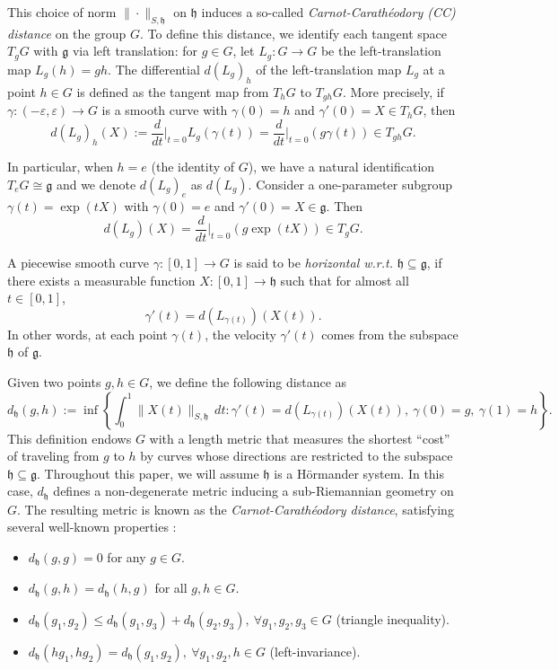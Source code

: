 \documentclass[11pt,reqno]{amsart}
\numberwithin{equation}{section}
\begin{document}
This choice of norm $\|\cdot\|_{S,\mathfrak{h}}$ on $\mathfrak{h}$ induces a so-called \textit{Carnot-Carathéodory (CC) distance} on the group $G$. To define this distance, we identify each tangent space $T_g G$ with $\mathfrak{g}$ via left translation: for $g \in G$, let $L_g: G \to G$ be the left-translation map $L_g(h) = gh$. The differential $d(L_g)_h$ of the left-translation map $L_g$ at a point $h \in G$ is defined as the tangent map from $T_h G$ to $T_{gh} G$. More precisely, if $\gamma: (-\varepsilon,\varepsilon) \to G$ is a smooth curve with $\gamma(0)=h$ and $\gamma'(0)=X \in T_h G$, then
$$
d(L_g)_h(X) := \frac{d}{dt}\bigg|_{t=0} L_g(\gamma(t)) = \frac{d}{dt}\bigg|_{t=0} (g\gamma(t)) \in T_{gh} G.
$$

In particular, when $h = e$ (the identity of $G$), we have a natural identification $T_e G \cong \mathfrak{g}$ and we denote $d(L_g)_e$ as $d(L_g)$. Consider a one-parameter subgroup $\gamma(t) = \exp(tX)$ with $\gamma(0)=e$ and $\gamma'(0)=X \in \mathfrak{g}$. Then
$$
d(L_g)(X) = \frac{d}{dt}\bigg|_{t=0} (g\exp(tX)) \in T_gG. $$

A piecewise smooth curve $\gamma: [0,1] \to G$ is said to be \textit{horizontal w.r.t. }$\mathfrak{h}\subseteq \mathfrak{g}$, if there exists a measurable function $X: [0,1] \to \mathfrak{h}$ such that for almost all $t \in [0,1]$,
$$
\gamma'(t) = d(L_{\gamma(t)})(X(t)).
$$
In other words, at each point $\gamma(t)$, the velocity $\gamma'(t)$ comes from the subspace $\mathfrak{h}$ of $\mathfrak{g}$.

Given two points $g,h \in G$, we define the following distance as
\begin{equation}\label{def:CC distance}
    d_\mathfrak{h}(g,h) := \inf \left\{ \int_0^1 \|X(t)\|_{S,\mathfrak{h}}\, dt : \gamma'(t) = d(L_{\gamma(t)})(X(t)),\ \gamma(0)=g,\ \gamma(1)=h \right\}.
\end{equation}
This definition endows \(G\) with a length metric that measures the shortest ``cost'' of traveling from \(g\) to \(h\) by curves whose directions are restricted to the subspace \(\mathfrak{h} \subseteq \mathfrak{g}\). Throughout this paper, we will assume $\mathfrak{h}$ is a H\"ormander system. In this case, $d_\mathfrak{h}$ defines a non-degenerate metric inducing a sub-Riemannian geometry on $G$. The resulting metric is known as the \textit{Carnot-Carath\'eodory distance}, satisfying several well-known properties \cite{Gromov1996}:
\begin{itemize}
    \item $d_\mathfrak{h}(g,g) = 0$ for any $g \in G$. 
    \item $d_\mathfrak{h}(g,h) = d_\mathfrak{h}(h,g)$ for all $g,h \in G$.
    \item $d_\mathfrak{h}(g_1,g_2) \le d_\mathfrak{h}(g_1,g_3) + d_\mathfrak{h}(g_2,g_3),\ \forall g_1,g_2,g_3\in G$ (triangle inequality).
    \item $d_\mathfrak{h}(hg_1,hg_2) = d_\mathfrak{h}(g_1,g_2),\ \forall g_1,g_2,h\in G$ (left-invariance). 
\end{itemize}
\end{document}
